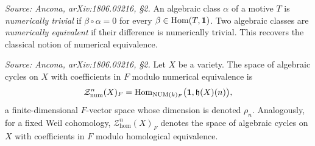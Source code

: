 \begin{definition}
  \label{def:num-equiv}
  \textit{Source: Ancona, arXiv:1806.03216, §2.}
  An algebraic class \(\alpha\) of a motive \(T\) is \emph{numerically trivial}
  if \(\beta \circ \alpha = 0\) for every \(\beta \in \mathrm{Hom}(T, \mathbf{1})\). Two
  algebraic classes are \emph{numerically equivalent} if their difference is
  numerically trivial. This recovers the classical notion of numerical
  equivalence.
\end{definition}

\begin{definition}
  \label{def:num-cycles}
  \textit{Source: Ancona, arXiv:1806.03216, §2.}
  Let \(X\) be a variety. The space of algebraic cycles on \(X\) with coefficients
  in \(F\) modulo numerical equivalence is
  \[\mathcal{Z}^{n}_{\mathrm{num}}(X)_{F} = \mathrm{Hom}_{\mathrm{NUM}(k)_F}\bigl(\mathbf{1}, \mathfrak{h}(X)(n)\bigr),\]
  a finite-dimensional \(F\)-vector space whose dimension is denoted \(\rho_n\).
  Analogously, for a fixed Weil cohomology, \(\mathcal{Z}^{n}_{\hom}(X)_{F}\)
  denotes the space of algebraic cycles on \(X\) with coefficients in \(F\)
  modulo homological equivalence.
\end{definition}
